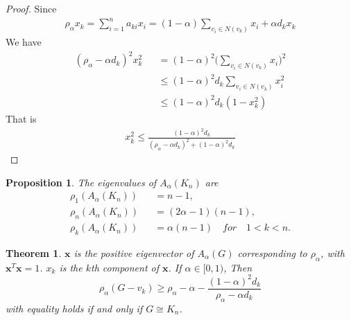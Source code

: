 \documentclass[amsthm]{elsart}
\newtheorem{theorem}{Theorem}[section]
\newtheorem{proposition}{Proposition}[section]
\begin{document}
\begin{proof}
Since
\begin{eqnarray*}
\rho _\alpha x_k = \sum \limits_{i = 1}^{n} a_{ki} x_i = (1 - \alpha) \sum \limits_{v_i \in N(v_k)}^{} x_i + \alpha d_k x_k
\end{eqnarray*}
We have
\begin{eqnarray*}
 (\rho _\alpha - \alpha d_k)^2 x_k^2
    &&= (1 - \alpha)^2 \big(\sum \limits_{v_i \in N(v_k)}^{} x_i \big)^2
    \\ &&\leqslant  (1 - \alpha)^2 d_k \sum \limits_{v_i \in N(v_k)}^{} x_i^2
    \\ &&\leqslant  (1 - \alpha)^2 d_k (1 - x_k^2)
\end{eqnarray*}
That is
\begin{eqnarray*}
x_k^2 \leqslant \frac{(1 - \alpha)^2 d_k}{(\rho _\alpha - \alpha d_k)^2 + (1 - \alpha)^2 d_k}
\end{eqnarray*}
\end{proof}

\begin{proposition} \label{prop:2}
The eigenvalues of $A_\alpha(K_n)$  are
\begin{eqnarray*}
\rho_1 (A_\alpha(K_n)) &&= n - 1 ,
\\ \rho _n (A_\alpha(K_n)) &&= (2 \alpha - 1)(n - 1) ,
\\ \rho _k (A_\alpha(K_n)) &&= \alpha (n-1) \quad for \quad 1<k<n .
\end{eqnarray*}
\end{proposition}

\begin{theorem} \label{the:4}
$\textbf{x}$ is the positive eigenvector of $A_\alpha (G)$ corresponding to $\rho _\alpha$, with $\textbf{x}^T \textbf{x} = 1$. $x_k$ is the $k$th component of $\textbf{x}$. If $\alpha \in [0, 1)$, Then
\begin{equation} \label{equ:16}
\rho _\alpha (G - v_k)
  \geqslant \rho _\alpha - \alpha - \frac{(1 - \alpha)^2 d_k}{\rho _\alpha - \alpha d_k}
\end{equation}
with equality holds if and only if $G \cong K_n$.
\end{theorem}
\end{document}
